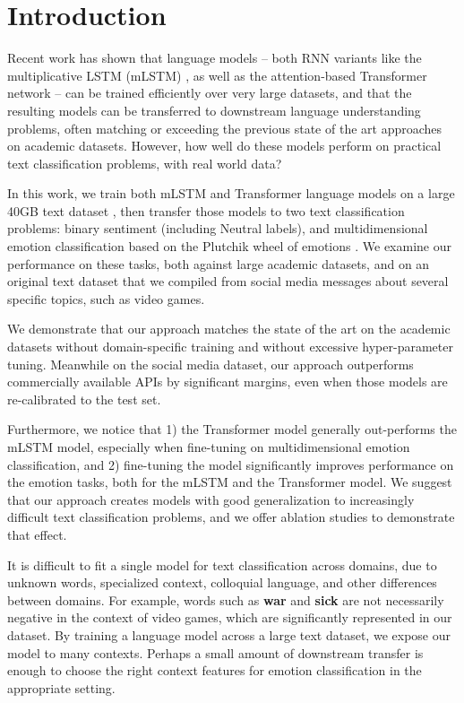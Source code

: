 \documentclass[letterpaper]{article} \usepackage{aaai19}  \usepackage{times}  \usepackage{helvet}  \usepackage{courier}  \usepackage{url}  \usepackage{graphicx}  \usepackage{booktabs}
\begin{document}
\section{Introduction}
Recent work has shown that language models -- both RNN variants like the multiplicative LSTM (mLSTM) \protect\cite{Krause2016}, as well as the attention-based Transformer network \protect\cite{Transformer2017} -- can be trained efficiently over very large datasets, and that the resulting models can be transferred to downstream language understanding problems, often matching or exceeding the previous state of the art approaches on academic datasets. However, how well do these models perform on practical text classification problems, with real world data?

In this work, we train both mLSTM and Transformer language models on a large 40GB text dataset \protect\cite{McAuley2015}, then transfer those models to two text classification problems: binary sentiment (including Neutral labels), and multidimensional emotion classification based on the Plutchik wheel of emotions \protect\cite{Plutchik1979}. We examine our performance on these tasks, both against large academic datasets, and on an original text dataset that we compiled from social media messages about several specific topics, such as video games. 

We demonstrate that our approach matches the state of the art on the academic datasets without domain-specific training and without excessive hyper-parameter tuning. Meanwhile on the social media dataset, our approach outperforms commercially available APIs by significant margins, even when those models are re-calibrated to the test set. 

Furthermore, we notice that 1) the Transformer model generally out-performs the mLSTM model, especially when fine-tuning on multidimensional emotion classification, and 2) fine-tuning the model significantly improves performance on the emotion tasks, both for the mLSTM and the Transformer model. We suggest that our approach creates models with good generalization to increasingly difficult text classification problems, and we offer ablation studies to demonstrate that effect. 

It is difficult to fit a single model for text classification across domains, due to unknown words, specialized context, colloquial language, and other differences between domains. For example, words such as \textbf{war} and \textbf{sick} are not necessarily negative in the context of video games, which are significantly represented in our dataset. By training a language model across a large text dataset, we expose our model to many contexts. Perhaps a small amount of downstream transfer is enough to choose the right context features for emotion classification in the appropriate setting. 
\end{document}
